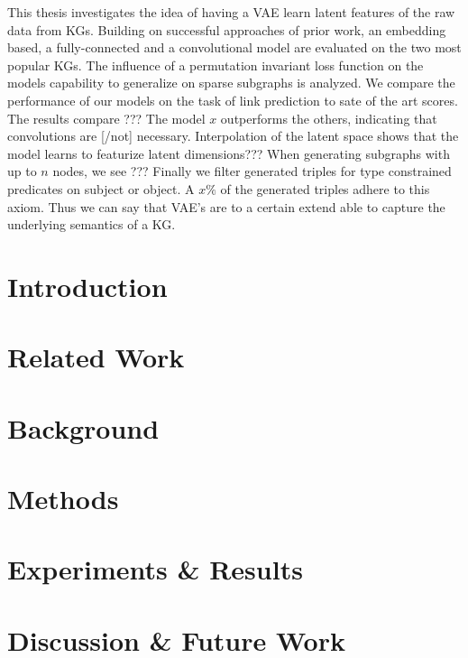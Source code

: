 \documentclass{article}
\begin{document}
This thesis investigates the idea of having a VAE learn latent features of the raw data from KGs. Building on successful approaches of prior work, an embedding based, a fully-connected and a convolutional model are evaluated on the two most popular KGs. The influence of a permutation invariant loss function on the models capability to generalize on sparse subgraphs is analyzed.
We compare the performance of our models on the task of link prediction to sate of the art scores.
The results compare ???
The model $x$ outperforms the others, indicating that convolutions are [/not] necessary.
Interpolation of the latent space shows that the model learns to featurize latent dimensions???
When generating subgraphs with up to $n$ nodes, we see ???
Finally we filter generated triples for type constrained predicates on subject or object. A $x\%$ of the generated triples adhere to this axiom. Thus we can say that VAE's are to a certain extend able to capture the underlying semantics of a KG.   


% 

\section{Introduction}


\section{Related Work}


\section{Background}


\section{Methods}

\label{sec:mthods}

\section{Experiments \& Results}


% 

\section{Discussion \& Future Work}

\label{sec:discus}

% 

% 

\printbibliography
\end{document}
